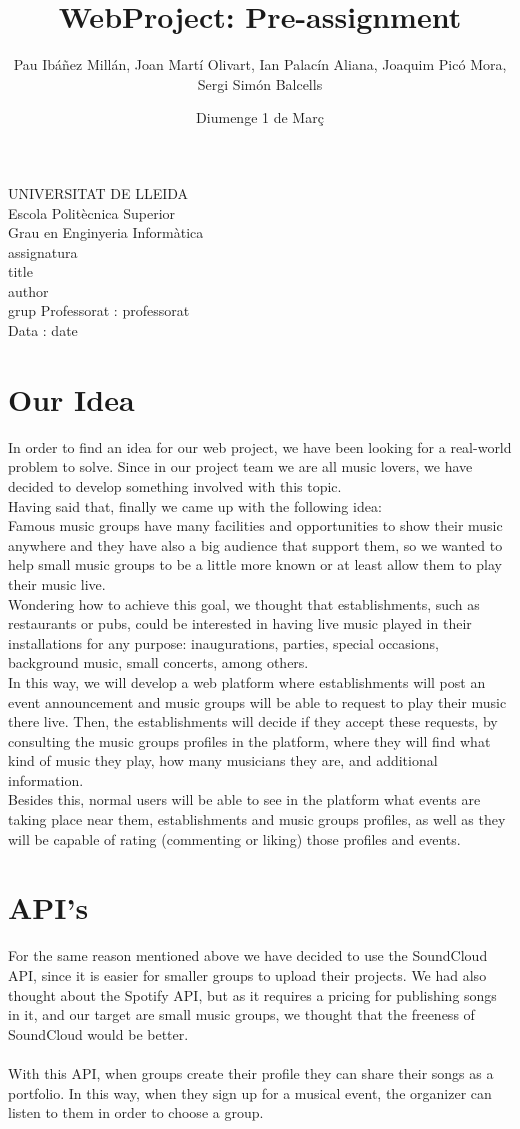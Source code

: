 \documentclass{article}
\title{WebProject: Pre-assignment}
\author{Pau Ibáñez Millán, Joan Martí Olivart, Ian Palacín Aliana, Joaquim Picó Mora, Sergi Simón Balcells}
\date{Diumenge 1 de Març}
\renewcommand{\maketitle}{ %
    \begin{titlepage}
        \raggedright{UNIVERSITAT DE LLEIDA \\
            Escola Politècnica Superior \\
            Grau en Enginyeria Informàtica\\
            \1assignatura\\}
            \vspace{5cm}
            \centering\huge{\5title \\}
            \vspace{3cm}
            \large{\6author} \\
            \normalsize{\3grup}
            \vfill
            Professorat : \4professorat \\
            Data : \7date
\end{titlepage}}
\begin{document}
    \maketitle
    \thispagestyle{empty}
    
    \newpage
    \tableofcontents
    \newpage
    
\section{Our Idea}
In order to find an idea for our web project, we have been looking for a real-world problem to solve. Since in our project team we are all music lovers, we have decided to develop something involved with this topic. \\
Having said that, finally we came up with the following idea: \\
Famous music groups have many facilities and opportunities to show their music anywhere and they have also a big audience that support them, so we wanted to help small music groups to be a little more known or at least allow them to play their music live. \\
Wondering how to achieve this goal, we thought that establishments, such as restaurants or pubs, could be interested in having live music played in their installations for any purpose: inaugurations, parties, special occasions, background music, small concerts, among others. \\
In this way, we will develop a web platform where establishments will post an event announcement and music groups will be able to request to play their music there live. Then, the establishments will decide if they accept these requests, by consulting the music groups profiles in the platform, where they will find what kind of music they play, how many musicians they are, and additional information. \\
Besides this, normal users will be able to see in the platform what events are taking place near them, establishments and music groups profiles, as well as they will be capable of rating (commenting or liking) those profiles and events. \\

\section{API's}
For the same reason mentioned above we have decided to use the SoundCloud API, since it is easier for smaller groups to upload their projects. We had also thought about the Spotify API, but as it requires a pricing for publishing songs in it, and our target are
small music groups, we thought that the freeness of SoundCloud would be better.
\\\\
With this API, when groups create their profile they can share their songs as a portfolio. In this way, when they sign up for a musical event, the organizer can listen to them in order to choose a group.
\newpage
\end{document}
